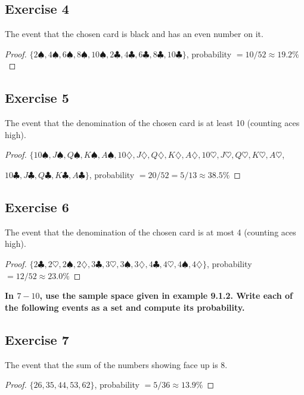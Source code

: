 \documentclass[14pt]{extarticle}
\newcommand{\cy}{\color{cyan}}
\begin{document}
\subsection{Exercise 4}
The event that the chosen card is black and has an even number on it.

\begin{proof}
\(\{2\spadesuit, 4\spadesuit, 6\spadesuit, 8\spadesuit, 10\spadesuit, 2\clubsuit, 4\clubsuit, 6\clubsuit, 
8\clubsuit, 10\clubsuit\}\), probability \(= 10/52 \approx 19.2\%\)
\end{proof}

\subsection{Exercise 5}
The event that the denomination of the chosen card is at least 10 (counting aces high).

\begin{proof}
\(\{10\spadesuit, J\spadesuit, Q\spadesuit, K\spadesuit, A\spadesuit, 10\diamondsuit, J\diamondsuit, Q\diamondsuit, 
K\diamondsuit, A\diamondsuit, 10\heartsuit, J\heartsuit, Q\heartsuit, K\heartsuit, A\heartsuit\), 

\(10\clubsuit, J\clubsuit, Q\clubsuit, K\clubsuit, A\clubsuit\}\), probability \(= 20/52=5/13 \approx 38.5\%\)
\end{proof}

\subsection{Exercise 6}
The event that the denomination of the chosen card is at most 4 (counting aces high).

\begin{proof}
\(\{2\clubsuit, 2\heartsuit, 2\spadesuit, 2\diamondsuit, 3\clubsuit, 3\heartsuit, 3\spadesuit, 3\diamondsuit, 
4\clubsuit, 4\heartsuit, 4\spadesuit, 4\diamondsuit\}\), probability \(= 12/52 \approx 23.0\%\)
\end{proof}

{\bf \cy In $7-10$, use the sample space given in example 9.1.2. Write each of the following events as a set and 
compute its probability.}

\subsection{Exercise 7}
The event that the sum of the numbers showing face up is 8.

\begin{proof}
\(\{26, 35, 44, 53, 62\}\), probability \(= 5/36 \approx 13.9\%\)
\end{proof}
\end{document}
